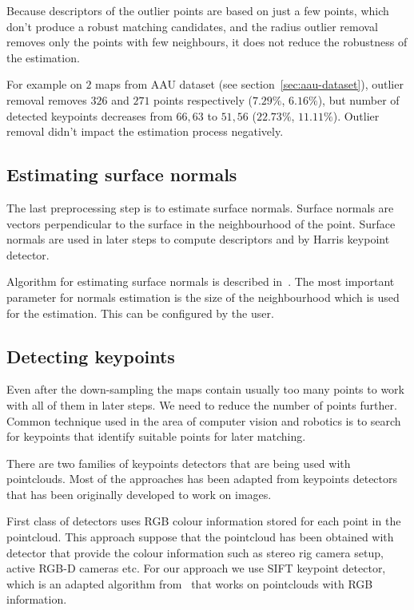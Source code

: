 Because descriptors of the outlier points are based on just a few points, which don't produce a robust matching candidates, and the radius outlier removal removes only the points with few neighbours, it does not reduce the robustness of the estimation.

For example on $2$ maps from \gls{AAU} dataset (see section~\ref{sec:aau-dataset}), outlier removal removes $326$ and $271$ points respectively ($7.29\%$, $6.16\%$), but number of detected keypoints decreases from $66, 63$ to $51, 56$ ($22.73\%$, $11.11\%$). Outlier removal didn't impact the estimation process negatively.

\subsection{Estimating surface normals}
\label{sec:normal-estimation}

The last preprocessing step is to estimate surface normals. Surface normals are vectors perpendicular to the surface in the neighbourhood of the point. Surface normals are used in later steps to compute descriptors and by Harris keypoint detector.

Algorithm for estimating surface normals is described in~\citet{RusuDoctoralDissertation}. The most important parameter for normals estimation is the size of the neighbourhood which is used for the estimation. This can be configured by the user.

\subsection{Detecting keypoints}

Even after the down-sampling the maps contain usually too many points to work with all of them in later steps. We need to reduce the number of points further. Common technique used in the area of computer vision and robotics is to search for keypoints that identify suitable points for later matching.

There are two families of keypoints detectors that are being used with pointclouds. Most of the approaches has been adapted from keypoints detectors that has been originally developed to work on images.

First class of detectors uses \gls{RGB} colour information stored for each point in the pointcloud. This approach suppose that the pointcloud has been obtained with detector that provide the colour information such as stereo rig camera setup, active \gls{RGB-D} cameras etc. For our approach we use \gls{SIFT} keypoint detector, which is an adapted algorithm from~\citet{lowe2004distinctive} that works on pointclouds with \gls{RGB} information.

